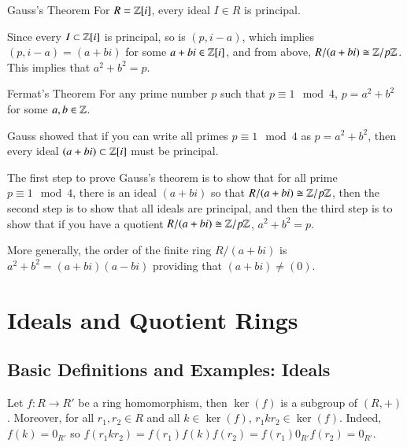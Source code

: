\documentclass[12pt, a4paper, twoside, openright, titlepage]{book}
\begin{document}
\begin{thm}{Gauss's Theorem}{}
        For $R = \mathbb Z[i]$, every ideal $I \in R$ is principal.
\end{thm}

\begin{cor}{}{}
        Since every $I \subset \mathbb Z[i]$ is principal, so is $(p,i-a)$, which implies $(p,i-a) = (a+bi)$ for some $a+bi \in \mathbb Z[i]$, and from above, $R/(a+bi) \cong \mathbb Z/p\mathbb Z$. This implies that $a^2+b^2 = p$.
\end{cor}


\begin{thm}{Fermat's Theorem}{}
        For any prime number $p$ such that $p \equiv 1 \mod 4$, $p = a^2 + b^2$ for some $a,b \in \mathbb Z$.
\end{thm}


\begin{rmk}{}{}
        Gauss showed that if you can write all primes $p\equiv 1 \mod 4$ as $p = a^2 +b^2$, then every ideal $(a+bi) \subset \mathbb Z[i]$ must be principal.
\end{rmk}

\begin{rmk}{}{}
        The first step to prove Gauss's theorem is to show that for all prime $p\equiv 1 \mod 4$, there is an ideal $(a+bi)$ so that $R/(a+bi) \cong \mathbb Z/p\mathbb Z$, then the second step is to show that all ideals are principal, and then the third step is to show that if you have a quotient $R/(a+bi) \cong \mathbb Z/p\mathbb Z$, $a^2+b^2 = p$.
\end{rmk}


\begin{rmk}{}{}
        More generally, the order of the finite ring $R/(a+bi)$ is $a^2+b^2 = (a+bi)(a-bi)$ providing that $(a+bi) \neq (0)$.
\end{rmk}



\chapter{\textsection\textsection Ideals and Quotient Rings}

\section{\textsection Basic Definitions and Examples: Ideals}


\begin{rmk}{}{}
    Let $f:R\rightarrow R'$ be a ring homomorphism, then $\ker(f)$ is a subgroup of $(R,+)$. Moreover, for all $r_1,r_2 \in R$ and all $k \in \ker(f)$, $r_1kr_2 \in \ker(f)$. Indeed, $f(k) = 0_{R'}$ so $f(r_1kr_2) = f(r_1)f(k)f(r_2) = f(r_1)0_{R'}f(r_2) = 0_{R'}$.
\end{rmk}
\end{document}
